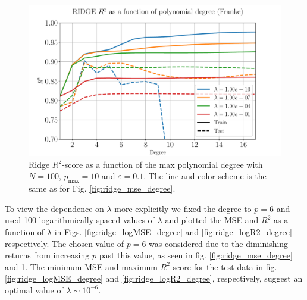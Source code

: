 \documentclass[%
reprint,
amsmath,amssymb,
aps,
pra,
]{revtex4-2}
\begin{document}
\begin{figure}[ht!]
	\centering
	\includegraphics[width=\linewidth]{Python/Figures/Ridge/RIDGE_R2_Unscaled.pdf}
	\caption{Ridge $R^2$-score as a function of the max polynomial degree with \(N=100\), \(p_{\text{max}}=10\) and \(\varepsilon=0.1\). The line and color scheme is the same as for Fig. \ref{fig:ridge_mse_degree}.}
	\label{fig:ridge_r2_degree}
\end{figure}

To view the dependence on $\lambda$ more explicitly we fixed the degree to \(p=6\) and used 100 logarithmically spaced values of $\lambda$ and plotted the MSE and $R^2$ as a function of $\lambda$ in Figs. \ref{fig:ridge_logMSE_degree} and \ref{fig:ridge_logR2_degree} respectively. The chosen value of $p=6$ was considered due to the diminishing returns from increasing \(p\) past this value, as seen in fig. \ref{fig:ridge_mse_degree} and \ref{fig:ridge_r2_degree}. The minimum MSE and maximum \(R^2\)-score for the test data in fig. \ref{fig:ridge_logMSE_degree} and \ref{fig:ridge_logR2_degree}, respectively, suggest an optimal value of $\lambda\sim 10^{-6}$.
\end{document}
